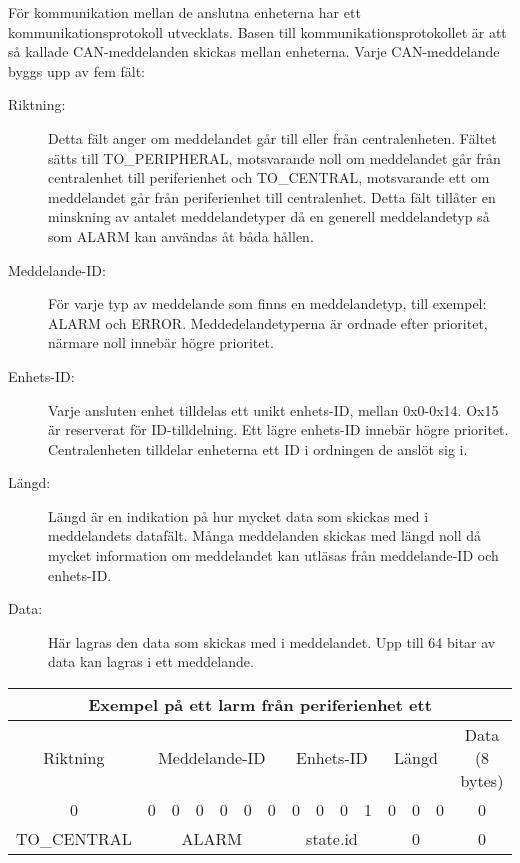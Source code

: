 \documentclass[a4paper]{article}
\begin{document}
För kommunikation mellan de anslutna enheterna har ett kommunikationsprotokoll utvecklats. Basen till kommunikationsprotokollet är att så kallade CAN-meddelanden skickas mellan enheterna. Varje CAN-meddelande byggs upp av fem fält:
\begin{description}
    \item[Riktning:] Detta fält anger om meddelandet går till eller från centralenheten.
    Fältet sätts till TO\_PERIPHERAL, motsvarande noll om meddelandet går från centralenhet till periferienhet och TO\_CENTRAL, motsvarande ett om meddelandet går från periferienhet till centralenhet. 
    Detta fält tillåter en minskning av antalet meddelandetyper då en generell meddelandetyp så som ALARM kan användas åt båda hållen.

    \item[Meddelande-ID:] För varje typ av meddelande som finns en meddelandetyp, till exempel: ALARM och ERROR.
    Meddedelandetyperna är ordnade efter prioritet, närmare noll innebär högre prioritet.
    
    \item[Enhets-ID:] Varje ansluten enhet tilldelas ett unikt enhets-ID, mellan 0x0-0x14. Ox15 är reserverat för ID-tilldelning. Ett lägre enhets-ID innebär högre prioritet.
    Centralenheten tilldelar enheterna ett ID i ordningen de anslöt sig i.
    
    \item[Längd:] Längd är en indikation på hur mycket data som skickas med i meddelandets datafält.
    Många meddelanden skickas med längd noll då mycket information om meddelandet kan utläsas från meddelande-ID och enhets-ID.

    \item[Data:] Här lagras den data som skickas med i meddelandet. Upp till 64 bitar av data kan lagras i ett meddelande.
\end{description}

\begin{table}[H]
    \centering
    \begin{tabular}{|c|c|c|c|c|c|c|c|c|c|c|c|c|c|c|}\hline
        \multicolumn{15}{|c|}{Exempel på ett larm från periferienhet ett}\\\hline
        \multicolumn{1}{|c|}{Riktning} & \multicolumn{6}{|c|}{Meddelande-ID} & \multicolumn{4}{|c|}{Enhets-ID} & \multicolumn{3}{|c|}{Längd} & \multicolumn{1}{|c|}{Data (8 bytes)} \\\hline
        0 & 0 & 0 & 0 & 0 & 0 & 0 & 0 & 0 & 0 & 1 & 0 & 0 & 0 & 0 \\\hline
        \multicolumn{1}{|c|}{TO\_CENTRAL} & \multicolumn{6}{|c|}{ALARM} & \multicolumn{4}{|c|}{state.id} & \multicolumn{3}{|c|}{0} & \multicolumn{1}{|c|}{0} \\\hline
    \end{tabular}
\end{table}
\end{document}
